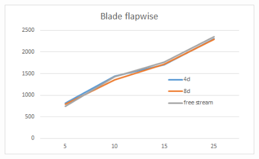 \documentclass[12pt,t]{beamer}
\begin{document}
\begin{frame}
\begin{figure}[H]
\begin{minipage}{0.40\textwidth}
\end{minipage}
\begin{minipage}{0.40\textwidth}
  \includegraphics[width=1\linewidth]{figures/delsBldFlap.png}
\end{minipage}
\end{figure}
\end{frame}
\end{document}

